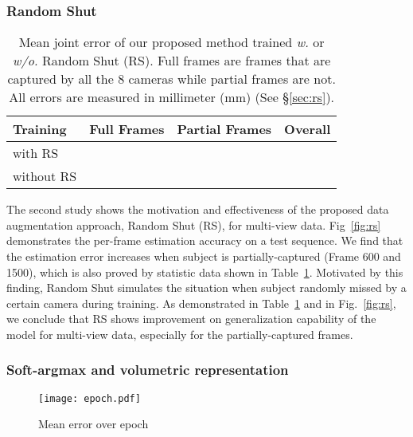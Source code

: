 \documentclass[10pt,twocolumn,letterpaper]{article}
\begin{document}
\vspace{-0.2cm}
\subsubsection{Random Shut}
\vspace*{-4pt}
\label{sec:rs}

\begin{table}
\begin{center}
\begin{tabular}{|l|c|c|c|}
\hline
 Training & Full Frames & Partial Frames & Overall \\
\hline
with RS &  &  & \\
without RS & &  & \\
\hline
\end{tabular}
\end{center}
\vspace{-0.3cm}
\caption{Mean joint error of our proposed method trained \textit{w.} or \textit{w/o.} Random Shut (RS). Full frames are frames that are captured by all the 8 cameras while partial frames are not. All errors are measured in millimeter (mm) (See \S\ref{sec:rs}). }
\label{tab:rs}
\vspace*{-10pt}
\end{table}

The second study shows the motivation and effectiveness of the proposed data augmentation approach, Random Shut (RS), for multi-view data. Fig~\ref{fig:rs} demonstrates the per-frame estimation accuracy on a test sequence. We find that the estimation error increases when subject is partially-captured (Frame 600 and 1500), which is also proved by statistic data shown in Table~\ref{tab:rs}. Motivated by this finding, Random Shut simulates the situation when subject randomly missed by a certain camera during training. As demonstrated in Table~\ref{tab:rs} and in Fig.~\ref{fig:rs}, we conclude that RS shows improvement on generalization capability of the model for multi-view data, especially for the partially-captured frames.

\vspace{-0.3cm}
\subsubsection{Soft-argmax and volumetric representation}
\label{sec:soft_argmax}
\vspace*{-4pt}

\begin{figure}
\begin{center}
\texttt{[image: epoch.pdf]}
\end{center}
    \vspace{-0.5cm}
  \caption{Mean error over epoch}
   \vspace{-0.2cm}
\label{fig:epoch}
\end{figure}
\end{document}
